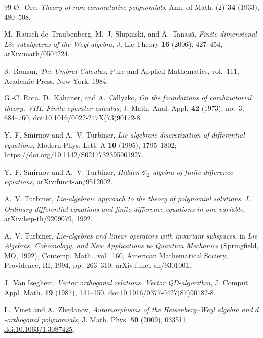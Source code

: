 \documentclass[11pt,reqno]{amsart}
\numberwithin{equation}{section}
\theoremstyle{definition}
\theoremstyle{remark}
\begin{document}
\begin{thebibliography}{99}
\O.~Ore,
\emph{Theory of non-commutative polynomials},
Ann. of Math. (2) \textbf{34} (1933), 480--508.

M.~Rausch de~Traubenberg, M.~J. Slupinski, and A.~Tanas\u{a},
\emph{Finite-dimensional Lie subalgebras of the Weyl algebra},
J. Lie Theory \textbf{16} (2006), 427--454,
\href{https://arxiv.org/abs/math/0504224}{arXiv:math/0504224}.

S.~Roman,
\emph{The Umbral Calculus},
Pure and Applied Mathematics, vol.~111, Academic Press, New York, 1984.

G.-C. Rota, D.~Kahaner, and A.~Odlyzko,
\emph{On the foundations of combinatorial theory. VIII. Finite operator calculus},
J. Math. Anal. Appl. \textbf{42} (1973), no.~3, 684--760,
\href{https://doi.org/10.1016/0022-247X(73)90172-8}{doi:10.1016/0022-247X(73)90172-8}.

Y.~F. Smirnov and A.~V. Turbiner,
\emph{Lie-algebraic discretization of differential equations},
Modern Phys. Lett. A \textbf{10} (1995), 1795--1802; \href{https://doi.org/10.1142/S0217732395001927}{https://doi.org/10.1142/S0217732395001927}.

Y.~F. Smirnov and A.~V. Turbiner,
\emph{Hidden $\mathfrak{sl}_2$-algebra of finite-difference equations}, arXiv:funct-an/9512002.

A.~V. Turbiner,
\emph{Lie-algebraic approach to the theory of polynomial solutions. I. Ordinary differential equations and finite-difference equations in one variable},
arXiv:hep-th/9209079, 1992.

A.~V. Turbiner,
\emph{Lie-algebras and linear operators with invariant subspaces},
in \emph{Lie Algebras, Cohomology, and New Applications to Quantum Mechanics}
(Springfield, MO, 1992), Contemp. Math., vol.~160,
American Mathematical Society, Providence, RI, 1994, pp.~263--310;
arXiv:funct-an/9301001.

J.~Van Iseghem,
\emph{Vector orthogonal relations. Vector QD-algorithm},
J. Comput. Appl. Math. \textbf{19} (1987), 141--150,
\href{https://doi.org/10.1016/0377-0427(87)90182-8}{doi:10.1016/0377-0427(87)90182-8}.

L.~Vinet and A.~Zhedanov,
\emph{Automorphisms of the Heisenberg--Weyl algebra and $d$-orthogonal polynomials},
J. Math. Phys. \textbf{50} (2009), 033511,
\href{https://doi.org/10.1063/1.3087425}{doi:10.1063/1.3087425}.

\end{thebibliography}
\end{document}
